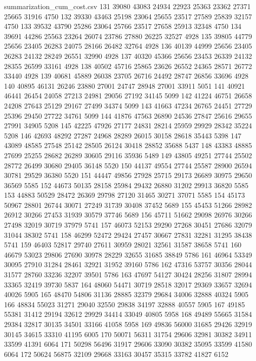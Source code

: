 \begin{filecontents*}{summarization_cum_cost.csv}
131	39080	43083	24934	22923	25363	23362	27371	25665	31916	4750
132	39330	43463	25198	23064	25655	23517	27589	25839	32157	4750
133	39532	43790	25286	23064	25766	23517	27658	25913	32348	4750
134	39691	44286	25563	23264	26074	23786	27880	26225	32527	4928
135	39805	44779	25656	23405	26283	24075	28166	26482	32764	4928
136	40139	44999	25656	23405	26283	24132	28249	26551	32990	4928
137	40320	45366	25656	23453	26339	24132	28355	26599	33161	4928
138	40502	45716	25865	23626	26552	24365	28571	26772	33440	4928
139	40681	45889	26038	23705	26716	24492	28747	26856	33696	4928
140	40895	46131	26246	23880	27001	24747	28948	27001	33911	5051
141	40921	46441	26454	24058	27213	24981	29056	27192	34145	5099
142	41224	46751	26658	24208	27643	25129	29167	27499	34374	5099
143	41663	47234	26765	24451	27729	25396	29450	27722	34761	5099
144	41876	47563	26890	24536	27847	25616	29655	27991	34905	5208
145	42225	47926	27177	24831	28214	25959	29929	28342	35224	5208
146	42693	48292	27287	24968	28289	26015	30158	28618	35443	5398
147	43089	48585	27548	25142	28505	26124	30418	28852	35688	5437
148	43383	48885	27699	25255	28682	26289	30605	29116	35936	5489
149	43805	49251	27744	25502	28772	26499	30680	29405	36148	5520
150	44137	49554	27744	25587	28900	26594	30781	29529	36380	5520
151	44447	49856	27928	25715	29173	26689	30975	29650	36569	5585
152	44673	50135	28158	25984	29432	26880	31202	29913	36820	5585
153	44883	50529	28472	26369	29798	27120	31465	30271	37071	5585
154	45173	50967	28801	26744	30071	27249	31739	30408	37452	5689
155	45453	51266	28982	26912	30266	27453	31939	30579	37746	5689
156	45711	51662	29098	26976	30266	27498	32019	30719	37979	5741
157	46073	52153	29290	27268	30451	27686	32079	31044	38302	5741
158	46299	52472	29424	27457	30667	27831	32281	31295	38438	5741
159	46403	52817	29740	27611	30959	28021	32561	31587	38658	5741
160	46679	53023	29806	27690	30978	28229	32655	31685	38849	5786
161	46964	53349	30095	27910	31284	28461	32921	31952	39160	5786
162	47316	53757	30356	28044	31577	28760	33236	32207	39501	5786
163	47697	54127	30424	28256	31807	28994	33365	32419	39730	5837
164	48060	54471	30719	28518	32017	29369	33657	32694	40026	5905
165	48470	54806	31136	28885	32379	29684	34006	32888	40324	5905
166	48834	55023	31271	29040	32550	29838	34197	32888	40557	5905
167	49185	55381	31412	29194	32612	29929	34414	33049	40805	5958
168	49489	55665	31584	29384	32817	30135	34501	33166	41058	5958
169	49836	56000	31685	29426	32919	30145	34615	33310	41195	6005
170	50071	56311	31754	29606	32981	30382	34911	33599	41391	6064
171	50298	56496	31917	29606	33090	30382	35095	33599	41580	6064
172	50624	56875	32109	29668	33163	30457	35315	33782	41827	6152

\end{filecontents*}
